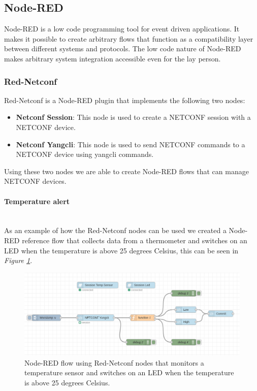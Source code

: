 \documentclass[12pt]{article}
\newcommand{\subsubsubsection}[1]{\paragraph{#1}\mbox{}\\}
\begin{document}
\newpage

\subsection{Node-RED}
Node-RED is a low code programming tool for event driven applications.
It makes it possible to create arbitrary flows that function as a compatibility layer
between different systems and protocols. The low code nature of Node-RED makes arbitrary system
integration accessible even for the lay person.

\subsubsection{Red-Netconf}
Red-Netconf \cite{LightsideinstrumentsRednetconf} is a Node-RED plugin that implements the following two 
nodes:
\begin{itemize}
  \item \textbf{Netconf Session}: This node is used to create a NETCONF session with a NETCONF device.
  \item \textbf{Netconf Yangcli}: This node is used to send NETCONF commands to a NETCONF device using yangcli commands.
\end{itemize}
Using these two nodes we are able to create Node-RED flows that can manage NETCONF devices.

\subsubsubsection{Temperature alert}
As an example of how the Red-Netconf nodes can be used we created
a Node-RED reference flow that collects data from a thermometer and switches on an LED
when the temperature is above 25 degrees Celsius, this can be seen in \textit{Figure \ref{fig:red-netconf}}.

\newpage

\begin{figure}
  \centering
  \includegraphics[width=\textwidth]{red-netconf.png}
  \caption{Node-RED flow using Red-Netconf nodes that monitors a temperature sensor and 
  switches on an LED when the temperature is above 25 degrees Celsius.}
  \label{fig:red-netconf}
\end{figure}
\end{document}
